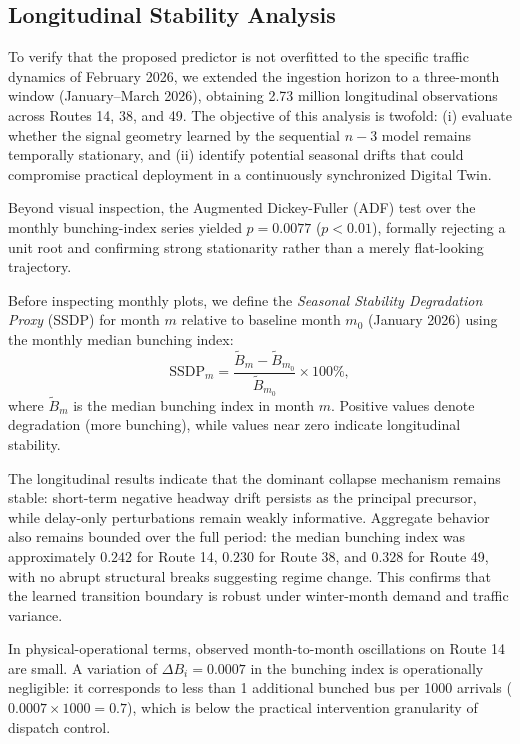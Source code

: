 \documentclass[journal,twocolumn]{IEEEtran}
\begin{document}
\subsection{Longitudinal Stability Analysis}
To verify that the proposed predictor is not overfitted to the specific traffic dynamics of February 2026, we extended the ingestion horizon to a three-month window (January--March 2026), obtaining 2.73 million longitudinal observations across Routes 14, 38, and 49. The objective of this analysis is twofold: (i) evaluate whether the signal geometry learned by the sequential $n-3$ model remains temporally stationary, and (ii) identify potential seasonal drifts that could compromise practical deployment in a continuously synchronized Digital Twin.

Beyond visual inspection, the Augmented Dickey-Fuller (ADF) test over the monthly bunching-index series yielded $p=0.0077$ ($p<0.01$), formally rejecting a unit root and confirming strong stationarity rather than a merely flat-looking trajectory.

Before inspecting monthly plots, we define the \textit{Seasonal Stability Degradation Proxy} (SSDP) for month $m$ relative to baseline month $m_0$ (January 2026) using the monthly median bunching index:
\begin{equation}
	\mathrm{SSDP}_{m}=\frac{\widetilde{B}_{m}-\widetilde{B}_{m_0}}{\widetilde{B}_{m_0}}\times 100\%,
\end{equation}
where $\widetilde{B}_{m}$ is the median bunching index in month $m$. Positive values denote degradation (more bunching), while values near zero indicate longitudinal stability.

The longitudinal results indicate that the dominant collapse mechanism remains stable: short-term negative headway drift persists as the principal precursor, while delay-only perturbations remain weakly informative. Aggregate behavior also remains bounded over the full period: the median bunching index was approximately $0.242$ for Route 14, $0.230$ for Route 38, and $0.328$ for Route 49, with no abrupt structural breaks suggesting regime change. This confirms that the learned transition boundary is robust under winter-month demand and traffic variance.

In physical-operational terms, observed month-to-month oscillations on Route 14 are small. A variation of $\Delta B_i=0.0007$ in the bunching index is operationally negligible: it corresponds to less than 1 additional bunched bus per 1000 arrivals ($0.0007\times 1000=0.7$), which is below the practical intervention granularity of dispatch control.
\end{document}
